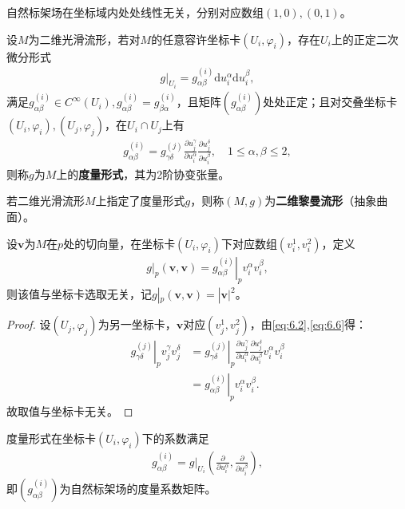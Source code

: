 \documentclass[../../main.tex]{subfiles}%
\begin{document}
\begin{remark}
自然标架场在坐标域内处处线性无关，分别对应数组$(1,0),(0,1)$。
\end{remark}

\begin{definition}
设$M$为二维光滑流形，若对$M$的任意容许坐标卡$(U_i,\varphi_i)$，存在$U_i$上的正定二次微分形式
\begin{align}
g|_{U_i}=g_{\alpha\beta}^{(i)}\mathrm{d}u_i^\alpha\mathrm{d}u_i^\beta,\label{eq:6.5}
\end{align}
满足$g_{\alpha\beta}^{(i)}\in C^\infty(U_i),g_{\alpha\beta}^{(i)}=g_{\beta\alpha}^{(i)}$，且矩阵$(g_{\alpha\beta}^{(i)})$处处正定；且对交叠坐标卡$(U_i,\varphi_i),(U_j,\varphi_j)$，在$U_i\cap U_j$上有
\begin{align}
g_{\alpha\beta}^{(i)}=g_{\gamma\delta}^{(j)}\frac{\partial u_j^\gamma}{\partial u_i^\alpha}\frac{\partial u_j^\delta}{\partial u_i^\beta},\quad 1\leqslant\alpha,\beta\leqslant2,\label{eq:6.6}
\end{align}
则称$g$为$M$上的\textbf{度量形式}，其为2阶协变张量。
\end{definition}

\begin{definition}
若二维光滑流形$M$上指定了度量形式$g$，则称$(M,g)$为\textbf{二维黎曼流形}（抽象曲面）。
\end{definition}

\begin{proposition}
设$\bm{v}$为$M$在$p$处的切向量，在坐标卡$(U_i,\varphi_i)$下对应数组$(v_i^1,v_i^2)$，定义
\begin{align}
g|_p(\bm{v},\bm{v})=\left.g_{\alpha\beta}^{(i)}\right|_p v_i^\alpha v_i^\beta,\label{eq:6.7}
\end{align}
则该值与坐标卡选取无关，记$g|_p(\bm{v},\bm{v})=|\bm{v}|^2$。
\end{proposition}

\begin{proof}
设$(U_j,\varphi_j)$为另一坐标卡，$\bm{v}$对应$(v_j^1,v_j^2)$，由\eqref{eq:6.2},\eqref{eq:6.6}得：
\begin{align*}
\left.g_{\gamma\delta}^{(j)}\right|_p v_j^\gamma v_j^\delta
&=\left.g_{\gamma\delta}^{(j)}\right|_p \frac{\partial u_j^\gamma}{\partial u_i^\alpha}\frac{\partial u_j^\delta}{\partial u_i^\beta}v_i^\alpha v_i^\beta\\
&=\left.g_{\alpha\beta}^{(i)}\right|_p v_i^\alpha v_i^\beta.
\end{align*}
故取值与坐标卡无关。
\end{proof}

\begin{remark}
度量形式在坐标卡$(U_i,\varphi_i)$下的系数满足
\begin{align}
g_{\alpha\beta}^{(i)}=g|_{U_i}\left(\frac{\partial}{\partial u_i^\alpha},\frac{\partial}{\partial u_i^\beta}\right),\label{eq:6.8}
\end{align}
即$(g_{\alpha\beta}^{(i)})$为自然标架场的度量系数矩阵。
\end{remark}
\end{document}
